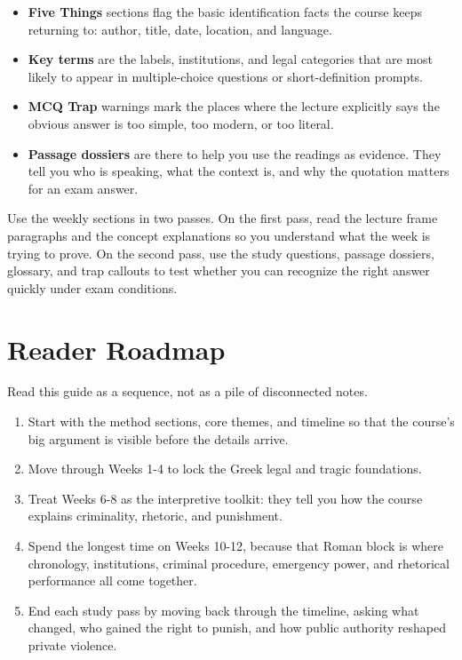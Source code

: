 \documentclass[11pt]{article}
\begin{document}
\begin{itemize}
\item \textbf{Five Things} sections flag the basic identification facts the course keeps returning to: author, title, date, location, and language.
\item \textbf{Key terms} are the labels, institutions, and legal categories that are most likely to appear in multiple-choice questions or short-definition prompts.
\item \textbf{MCQ Trap} warnings mark the places where the lecture explicitly says the obvious answer is too simple, too modern, or too literal.
\item \textbf{Passage dossiers} are there to help you use the readings as evidence. They tell you who is speaking, what the context is, and why the quotation matters for an exam answer.
\end{itemize}

Use the weekly sections in two passes. On the first pass, read the lecture frame paragraphs and the concept explanations so you understand what the week is trying to prove. On the second pass, use the study questions, passage dossiers, glossary, and trap callouts to test whether you can recognize the right answer quickly under exam conditions.

\section{Reader Roadmap}

Read this guide as a sequence, not as a pile of disconnected notes.

\begin{enumerate}
\item Start with the method sections, core themes, and timeline so that the course's big argument is visible before the details arrive.
\item Move through Weeks 1-4 to lock the Greek legal and tragic foundations.
\item Treat Weeks 6-8 as the interpretive toolkit: they tell you how the course explains criminality, rhetoric, and punishment.
\item Spend the longest time on Weeks 10-12, because that Roman block is where chronology, institutions, criminal procedure, emergency power, and rhetorical performance all come together.
\item End each study pass by moving back through the timeline, asking what changed, who gained the right to punish, and how public authority reshaped private violence.
\end{enumerate}
\end{document}
